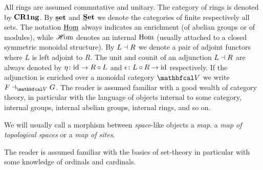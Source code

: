 
All rings are assumed commutative and unitary. The category of rings is denoted by ${\mathbf{CR1ng}}$. By ${{\mathbf{\underline{s}et}}}$ and ${{\mathbf{\underline{S}et}}}$ we denote the categories of finite respectively all sets. The notation ${\underline{\operatorname{Hom}}}$ always indicates an enrichment (\eg of abelian groups or of modules), while ${\operatorname{\mathscr{H}\!om}}$ denotes an internal ${\operatorname{Hom}}$ (usually attached to a closed symmetric monoidal structure). By $L\dashv R$ we denote a pair of adjoint functors where $L$ is left adjoint to $R$. The unit and counit of an adjunction $L\dashv R$ are always denoted by $\eta\colon \mathrm{id}\to R\circ L$ and $\epsilon\colon L\circ R\to \mathrm{id}$ respectively. If the adjunction is enriched over a monoidal category $\category{V}$ we write $F\ladj_\category{V} G$. The reader is assumed familiar with a good wealth of category theory, in particular with the language of objects internal to some category, \eg internal groups, internal abelian groups, internal rings, and so on.

We will usually call a morphism between \emph{space}-like objects a \emph{map}. \Eg a \emph{map of topological spaces} or a \emph{map of sites}.

The reader is assumed familiar with the basics of set-theory in particular with some knowledge of ordinals and cardinals.
